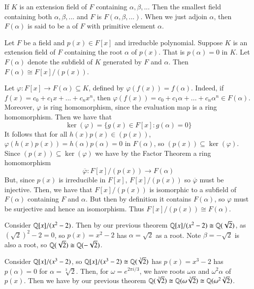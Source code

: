 \documentclass[12pt, a4paper, twoside, openright, titlepage]{book}
\begin{document}
\begin{defn}{}{}
    If $K$ is an extension field of $F$ containing $\alpha, \beta,...$ Then the smallest field containing both $\alpha,\beta,...$ and $F$ is $F(\alpha,\beta,...)$. When we just adjoin $\alpha$, then $F(\alpha)$ is said to be a  of $F$ with primitive element $\alpha$.
\end{defn}


\begin{thm}{}{}
    Let $F$ be a field and $p(x) \in F[x]$ and irreducble polynomial. Suppose $K$ is an extension field of $F$ containing the root $\alpha$ of $p(x)$. That is $p(\alpha) = 0$ in $K$. Let $F(\alpha)$ denote the subfield of $K$ generated by $F$ and $\alpha$. Then $F(\alpha) \cong F[x]/(p(x))$.
\end{thm}
\begin{proof*}{}{}
    Let $\varphi:F[x]\rightarrow F(\alpha) \subseteq K$, defined by $\varphi(f(x)) = f(\alpha)$. Indeed, if $f(x) = c_0+c_1x+...+c_nx^n$, then $\varphi(f(x)) = c_0+c_1\alpha+...+c_n\alpha^n \in F(\alpha)$. Moreover, $\varphi$ is ring homomorphism, since the evaluation map is a ring homomorphism. Then we have that $$\ker(\varphi) = \{g(x) \in F[x]:g(\alpha) = 0\}$$
    It follows that for all $h(x)p(x) \in (p(x))$, $\varphi(h(x)p(x)) = h(\alpha)p(\alpha) = 0$ in $F(\alpha)$, so $(p(x)) \subseteq \ker(\varphi)$. Since $(p(x)) \subseteq \ker(\varphi)$ we have by the Factor Theorem a ring homomorphism $$\overline{\varphi}:F[x]/(p(x)) \rightarrow F(\alpha)$$
    But, since $p(x)$ is irreducible in $F[x]$, $F[x]/(p(x))$ so $\overline{\varphi}$ must be injective. Then, we have that $F[x]/(p(x))$ is isomorphic to a subfield of $F(\alpha)$ containing $F$ and $\alpha$. But then by definition it contains $F(\alpha)$, so $\varphi$ must be surjective and hence an isomorphism. Thus $F[x]/(p(x)) \cong F(\alpha)$.
\end{proof*}


\begin{eg}{}{}
    Consider $\mathbb Q[x]/(x^2-2)$. Then by our previous theorem $\mathbb Q[x]/(x^2-2) \cong \mathbb Q(\sqrt{2})$, as $(\sqrt{2})^2 - 2 = 0$, so $p(x) = x^2-2$ has $\alpha = \sqrt{2}$ as a root. Note $\beta = -\sqrt{2}$ is also a root, so $\mathbb Q(\sqrt{2}) \cong \mathbb Q(-\sqrt{2})$.
\end{eg}

\begin{eg}{}{}
    Consider $\mathbb Q[x]/(x^3-2)$, so $\mathbb Q[x]/(x^3-2) \cong \mathbb Q(\sqrt[3]{2})$ has $p(x) = x^3-2$ has $p(\alpha) = 0$ for $\alpha = \sqrt[3]{2}$. Then, for $\omega = e^{2\pi i/3}$, we have roots $\omega\alpha$ and $\omega^2\alpha$ of $p(x)$. Then we have by our previous theorem $\mathbb Q(\sqrt[3]{2}) \cong \mathbb Q(\omega\sqrt[3]{2}) \cong \mathbb Q(\omega^2\sqrt[3]{2})$.
\end{eg}
\end{document}
